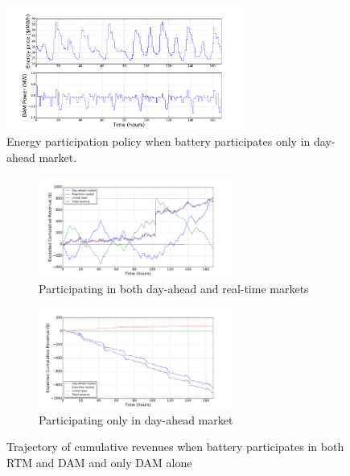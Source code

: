 \documentclass[11pt,twoside]{article}
\begin{document}
\begin{figure}[h!]
\begin{center}
\includegraphics[width=0.7\textwidth]
{Figures/Plots/onlydam/Pdam_fp_st.pdf} \caption{Energy participation policy when battery participates only in day-ahead market.}\label{fig:Pdam_onlydam}\end{center}
\end{figure}
\FloatBarrier
\begin{figure}[h!]
\begin{subfigure}[b]{\textwidth}
\centering
\includegraphics[width=0.7\textwidth]{Figures/Plots/fullproblem_stoch/cumulative_rev_fp_st.pdf} \caption{Participating in both day-ahead and real-time markets}\label{fig:cumulative_rev_fp_st}
\end{subfigure}\hfill
\begin{subfigure}[b]{\textwidth}
\centering
\includegraphics[width=0.7\textwidth]
{Figures/Plots/onlydam/cumulative_rev_fp_st.pdf} \caption{Participating only in day-ahead market}\label{fig:cumulative_rev_onlydam}
\end{subfigure}
\caption{Trajectory of cumulative revenues when battery participates in both RTM and DAM and only DAM alone}
\end{figure}
\FloatBarrier
\end{document}
